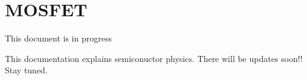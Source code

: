 \documentclass[letterpaper,10pt,english]{sphinxmanual}
\numberwithin{equation}{section}
\begin{document}
\sphinxstepscope


\section{MOSFET}
\label{\detokenize{MOSFET:mosfet}}\label{\detokenize{MOSFET::doc}}
\sphinxAtStartPar
This document is in progress

\sphinxAtStartPar
This documentation explains semiconuctor physics.
There will be updates soon!!
Stay tuned.

\sphinxAtStartPar
{}



\renewcommand{\indexname}{Index}
\printindex
\end{document}
